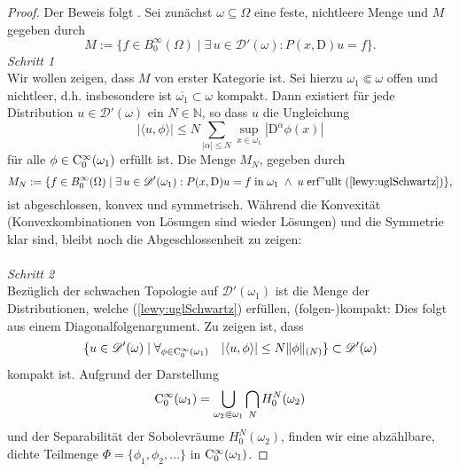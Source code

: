 \begin{proof} Der Beweis folgt {\cite[Theorem 3.2]{Hormander:1960a}}.
Sei zunächst $\omega\subseteq\Omega$ eine feste, nichtleere Menge und $M$ gegeben durch
\begin{equation}
M:=\{f\in B_0^\infty(\Omega)\mid \exists\,u\in\mathscr{D}'(\omega) : P(x,\mathrm{D})u=f\}.
\end{equation}
\textit{Schritt 1}\\
Wir wollen zeigen, dass $M$ von erster Kategorie ist. Sei hierzu $\omega_1\Subset\omega$ offen und nichtleer, d.h. insbesondere ist $\overline{\omega_1}\subset\omega$ kompakt. Dann existiert für jede Distribution $u\in\mathscr{D}'(\omega)$ ein $N\in\mathbb{N}$, so dass $u$ die Ungleichung
\begin{equation}\label{lewy:uglSchwartz}
|\langle u,\phi\rangle|\leq N\sum_{|\alpha|\leq N}\sup\limits_{x\in\omega_1} |\mathrm{D}^\alpha \phi(x)| 
\end{equation}
für alle $\phi\in \mathrm C_0^\infty(\omega_1)$ erfüllt ist. Die Menge $M_N$, gegeben durch
\begin{equation}
M_N:= \{f\in B_0^\infty(\Omega)\mid \exists\,u\in\mathscr D'(\omega_1): P(x,\mathrm{D})u=f\;\mathrm{in}\;\omega_1\;\wedge\; u\mathrm{\;erf"ullt\;}(\ref{lewy:uglSchwartz})\},
\end{equation}
ist abgeschlossen, konvex und symmetrisch. Während die Konvexität (Konvexkombinationen von Lösungen sind wieder Lösungen) und die Symmetrie klar sind, bleibt noch die Abgeschlossenheit zu zeigen:\\\\
\textit{Schritt 2}\\
Bezüglich der schwachen Topologie auf $\mathscr{D}'(\omega_1)$ ist die Menge der Distributionen, welche (\ref{lewy:uglSchwartz}) erfüllen, (folgen-)kompakt: Dies folgt aus einem Diagonalfolgenargument. Zu zeigen ist, dass
\begin{equation}
\{u\in\mathscr D'(\omega)\mid \forall_{\phi\in \mathrm C_0^\infty(\omega_1)}\quad |\langle u,\phi\rangle|\leq N \|\phi\|_{(N)}\}\subset\mathscr D'(\omega)
\end{equation}
kompakt ist.
Aufgrund der Darstellung
\begin{equation}
\mathrm C_0^\infty(\omega_1)=\bigcup\limits_{\omega_2\Subset\omega_1}\bigcap\limits_N H_0^N(\omega_2)
\end{equation}
und der Separabilität der Sobolevräume $H_0^N(\omega_2)$, finden wir eine abzählbare, dichte Teilmenge $\Phi=\{\phi_1,\phi_2,\ldots\}$ in $\mathrm C_0^\infty(\omega_1)$.

\end{proof}
